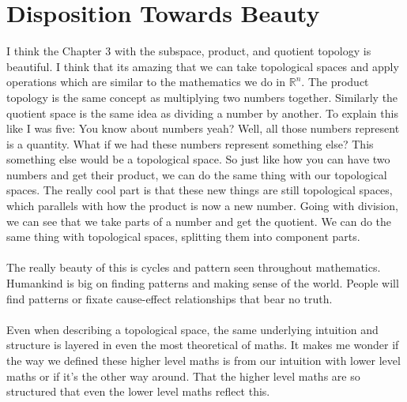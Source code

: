 \documentclass[12pt]{article}
\newcommand{\R}{\mathbb{R}}
\newcommand{\1}{^{-1}}
\begin{document}
	\section{Disposition Towards Beauty}
	I think the Chapter 3 with the subspace, product, and quotient topology is beautiful. I think that its amazing that we can take topological spaces and apply operations which are similar to the mathematics we do in $ \R^n $. The product topology is the same concept as multiplying two numbers together. Similarly the quotient space is the same idea as dividing a number by another. To explain this like I was five: You know about numbers yeah? Well, all those numbers represent is a quantity. What if we had these numbers represent something else? This something else would be a topological space. So just like how you can have two numbers and get their product, we can do the same thing with our topological spaces. The really cool part is that these new things are still topological spaces, which parallels with how the product is now a new number. Going with division, we can see that we take parts of a number and get the quotient. We can do the same thing with topological spaces, splitting them into component parts. \\
	\\
	The really beauty of this is cycles and pattern seen throughout mathematics. Humankind is big on finding patterns and making sense of the world. People will find patterns or fixate cause-effect relationships that bear no truth.\\
	\\
	 Even when describing a topological space, the same underlying intuition and structure is layered in even the most theoretical of maths. It makes me wonder if the way we defined these higher level maths is from our intuition with lower level maths or if it's the other way around. That the higher level maths are so structured that even the lower level maths reflect this.
\end{document}
